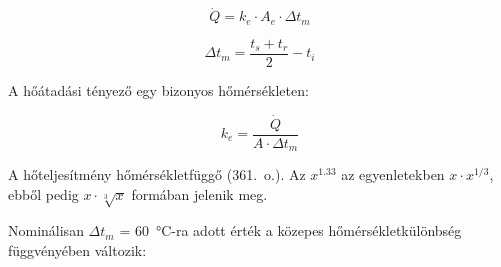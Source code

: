 


\begin{equation} \label{holeadas}
\dot Q = k_e \cdot A_e \cdot \Delta t_m
%
\end{equation}

\begin{equation} \label{termeszeteshk_359}
\Delta t_m = \frac{t_s+t_r}{2} -t_{i}
\end{equation}

A hőátadási tényező egy bizonyos hőmérsékleten:

\begin{equation} \label{termeszeteshk_359}
k_e = \frac{\dot{Q}}{A\cdot \Delta t_m}
\end{equation}

A hőteljesítmény hőmérsékletfüggő (361.~o.). Az $x^{1.33}$ az egyenletekben $x\cdot x^{1/3}$, ebből pedig $ x \cdot \sqrt[3]{x}$ formában jelenik meg.


Nominálisan $\Delta t_m$ = \SI{60}{\celsius}-ra adott érték a közepes hőmérsékletkülönbség függvényében változik:


\pagebreak